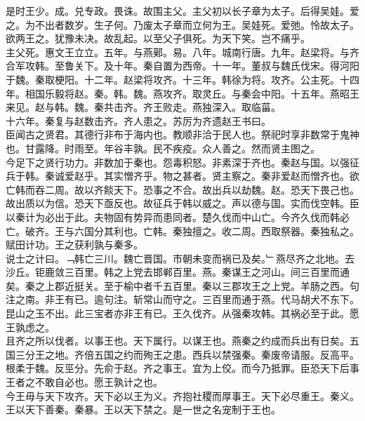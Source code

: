 \documentclass{zhvt-classic}
\begin{document}
\hspace*{2em}是时王少。成。兑专政。畏诛。故围主父。主父初以长子章为太子。后得吴娃。爱之。为不出者数岁。生子何。乃废太子章而立何为王。吴娃死。爱弛。怜故太子。欲两王之。犹豫未决。故乱起。以至父子俱死。为天下笑。岂不痛乎。\\
\hspace*{2em}主父死。惠文王立立。五年。与燕鄚。易。八年。城南行唐。九年。赵梁将。与齐合军攻韩。至鲁关下。及十年。秦自置为西帝。十一年。董叔与魏氏伐宋。得河阳于魏。秦取梗阳。十二年。赵梁将攻齐。十三年。韩徐为将。攻齐。公主死。十四年。相国乐毅将赵。秦。韩。魏。燕攻齐。取灵丘。与秦会中阳。十五年。燕昭王来见。赵与韩。魏。秦共击齐。齐王败走。燕独深入。取临菑。\\
\hspace*{2em}十六年。秦复与赵数击齐。齐人患之。苏厉为齐遗赵王书曰。\\
\hspace*{2em}臣闻古之贤君。其德行非布于海内也。教顺非洽于民人也。祭祀时享非数常于鬼神也。甘露降。时雨至。年谷丰孰。民不疾疫。众人善之。然而贤主图之。\\
\hspace*{2em}今足下之贤行功力。非数加于秦也。怨毒积怒。非素深于齐也。秦赵与国。以强征兵于韩。秦诚爱赵乎。其实憎齐乎。物之甚者。贤主察之。秦非爱赵而憎齐也。欲亡韩而吞二周。故以齐餤天下。恐事之不合。故出兵以劫魏。赵。恐天下畏己也。故出质以为信。恐天下亟反也。故征兵于韩以威之。声以德与国。实而伐空韩。臣以秦计为必出于此。夫物固有势异而患同者。楚久伐而中山亡。今齐久伐而韩必亡。破齐。王与六国分其利也。亡韩。秦独擅之。收二周。西取祭器。秦独私之。赋田计功。王之获利孰与秦多。\\
\hspace*{2em}说士之计曰。﹁韩亡三川。魏亡晋国。市朝未变而祸已及矣。﹂燕尽齐之北地。去沙丘。钜鹿敛三百里。韩之上党去邯郸百里。燕。秦谋王之河山。间三百里而通矣。秦之上郡近挺关。至于榆中者千五百里。秦以三郡攻王之上党。羊肠之西。句注之南。非王有已。逾句注。斩常山而守之。三百里而通于燕。代马胡犬不东下。昆山之玉不出。此三宝者亦非王有已。王久伐齐。从强秦攻韩。其祸必至于此。愿王孰虑之。\\
\hspace*{2em}且齐之所以伐者。以事王也。天下属行。以谋王也。燕秦之约成而兵出有日矣。五国三分王之地。齐倍五国之约而殉王之患。西兵以禁强秦。秦废帝请服。反高平。根柔于魏。反巠分。先俞于赵。齐之事王。宜为上佼。而今乃抵罪。臣恐天下后事王者之不敢自必也。愿王孰计之也。\\
\hspace*{2em}今王毋与天下攻齐。天下必以王为义。齐抱社稷而厚事王。天下必尽重王。秦义。王以天下善秦。秦暴。王以天下禁之。是一世之名宠制于王也。\\
\end{document}
